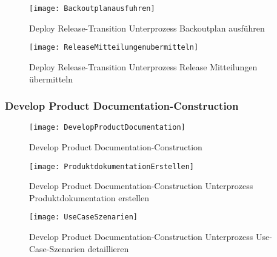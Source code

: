 \begin{figure}[!htbp]
\begin{center}
  \texttt{[image: Backoutplanausfuhren]} %
  \caption{Deploy Release-Transition Unterprozess Backoutplan ausführen}
  \label{fig:Backoutplanausfuhren}
\end{center}
\end{figure}


\begin{figure}[!htbp]
\begin{center}
  \texttt{[image: ReleaseMitteilungenubermitteln]} %
  \caption{Deploy Release-Transition Unterprozess Release Mitteilungen übermitteln}
  \label{fig:Backoutplanausfuhren}
\end{center}
\end{figure}

\subsubsection{Develop Product Documentation-Construction}

\begin{figure}[!htbp]
\begin{center}
  \texttt{[image: DevelopProductDocumentation]} %
  \caption{Develop Product Documentation-Construction}
  \label{fig:DevelopProductDocumentation}
\end{center}
\end{figure}

\begin{figure}[!htbp]
\begin{center}
  \texttt{[image: ProduktdokumentationErstellen]} %
  \caption{Develop Product Documentation-Construction Unterprozess Produktdokumentation erstellen}
  \label{fig:ProduktdokumentationErstellen}
\end{center}
\end{figure}

\begin{figure}[!htbp]
\begin{center}
  \texttt{[image: UseCaseSzenarien]} %
  \caption{Develop Product Documentation-Construction Unterprozess Use-Case-Szenarien detaillieren}
  \label{fig:UseCaseSzenarien}
\end{center}
\end{figure}

\clearpage

